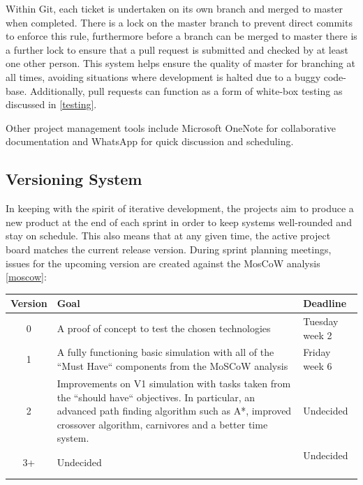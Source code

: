 \documentclass[a4paper, oneside, 11pt]{report}
\begin{document}
Within Git, each ticket is undertaken on its own branch and merged to master when completed. There is a lock on the master branch to prevent direct commits to enforce this rule, furthermore before a branch can be merged to master there is a further lock to ensure that a pull request is submitted and checked by at least one other person. This system helps ensure the quality of master for branching at all times, avoiding situations where development is halted due to a buggy code-base. Additionally, pull requests can function as a form of white-box testing as discussed in \ref{testing}.

Other project management tools include Microsoft OneNote for collaborative documentation and WhatsApp for quick discussion and scheduling.

\subsection{Versioning System}\label{versioning}
In keeping with the spirit of iterative development, the projects aim to produce a new product at the end of each sprint in order to keep systems well-rounded and stay on schedule. This also means that at any given time, the active project board matches the current release version. During sprint planning meetings, issues for the upcoming version are created against the MosCoW analysis \ref{moscow}:

\smallskip 
\begin{tabular}{c|p{}|l}
	Version & Goal & Deadline \\ \hline
	0 & A proof of concept to test the chosen technologies & Tuesday week 2 \\ \hline
	1 & A fully functioning basic simulation with all of the ``Must Have`` components from the MoSCoW analysis & Friday week 6 \\ \hline
	2 & Improvements on V1 simulation with tasks taken from the ``should have`` objectives. In particular, an advanced path finding algorithm such as A*, improved crossover algorithm, carnivores and a better time system. & Undecided \\ \hline
	3+ & Undecided & Undecided \
\end{tabular}
\smallskip 
\end{document}
